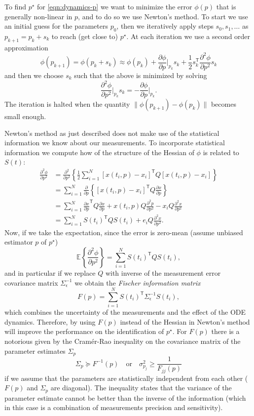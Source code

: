 \documentclass[a4paper]{article}
\newcommand{\T}{\mathsf{T}}
\newcommand{\E}[2][]{\mathbb{E}_{#1}\left\{#2\right\}}
\theoremstyle{plain}
\theoremstyle{definition}
\theoremstyle{remark}
\begin{document}
To find $p^\star$ for \eqref{eqn:dynamics-p} we want to minimize the error
$\phi(p)$ that is generally non-linear in $p$, and to do so we use Newton's
method. To start we use an initial guess for the parameters $p_0$, then we
iteratively apply steps $s_0, s_1, \ldots$ as $p_{k+1} = p_k + s_k$ to reach
(get close to) $p^\star$. At each iteration we use a second order
approximation
\[
  \phi(p_{k+1}) = \phi(p_k + s_k) \approx \phi(p_k)
    + \frac{\partial \phi}{\partial p} \bigg|_{p_k} s_k
    + \frac{1}{2} s_k^\T \frac{\partial^2 \phi}{\partial p^2} s_k
\]
and then we choose $s_k$ such that the above is minimized by solving
\[
  \frac{\partial^2 \phi}{\partial p^2} \bigg|_{p_k} s_k
    = - \frac{\partial \phi}{\partial p} \bigg|_{p_k}.
\]
The iteration is halted when the quantity $\|\phi(p_{k+1}) - \phi(p_k)\|$
becomes small enough.

Newton's method as just described does not make use of the statistical
information we know about our measurements. To incorporate statistical
information we compute how of the structure of the Hessian of $\phi$ is
related to $S(t)$:
\begin{align*}
  \frac{\partial^2 \phi}{\partial p^2}
    &= \frac{\partial^2}{\partial p^2} \left\{
        \frac{1}{2} \sum_{i=1}^N [x(t_i, p) - x_i]^\T Q [x(t_i, p) - x_i]
      \right\} \\
    &= \sum_{i=1}^N \frac{\partial}{\partial p} \left\{
        [x(t_i, p) - x_i]^\T Q \frac{\partial x}{\partial p}
      \right\} \\
    &= \sum_{i=1}^N \frac{\partial x}{\partial p}^\T Q
      \frac{\partial x}{\partial p} + x(t_i, p) Q\frac{\partial^2 p}{\partial p^2}
      - x_i Q \frac{\partial^2 x}{\partial p^2} \\
    &= \sum_{i=1}^N S(t_i)^\T Q S(t_i)
      + e_i Q \frac{\partial^2 x}{\partial p^2}.
\end{align*}
Now, if we take the expectation, since the error is zero-mean (assume unbiased
estimator $p$ of $p^\star$)
\[
  \E{\frac{\partial^2 \phi}{\partial p^2}} = \sum_{i=1}^N S(t_i)^\T Q S(t_i),
\]
and in particular if we replace $Q$ with inverse of the measurement error
covariance matrix $\Sigma_\epsilon^{-1}$ we obtain the \emph{Fischer
information matrix}
\[
  F(p) = \sum_{i=1}^N S(t_i)^\T \Sigma_\epsilon^{-1} S(t_i),
\]
which combines the uncertainty of the measurements and the effect of the ODE
dynamics. Therefore, by using $F(p)$ instead of the Hessian in Newton's method
will improve the performance on the identification of $p^\star$. For $F(p)$
there is a notorious given by the Cramér-Rao inequality on the covariance
matrix of the parameter estimates $\Sigma_p$
\[
  \Sigma_p \succeq F^{-1}(p)
  \quad\text{or}\quad
  \sigma_{p_j}^2 \geq \frac{1}{F_{jj}(p)}
\]
if we assume that the parameters are statistically independent from each other
($F(p)$ and $\Sigma_p$ are diagonal). The inequality states that the variance
of the parameter estimate cannot be better than the inverse of the information
(which in this case is a combination of measurements precision and
sensitivity).
\end{document}
